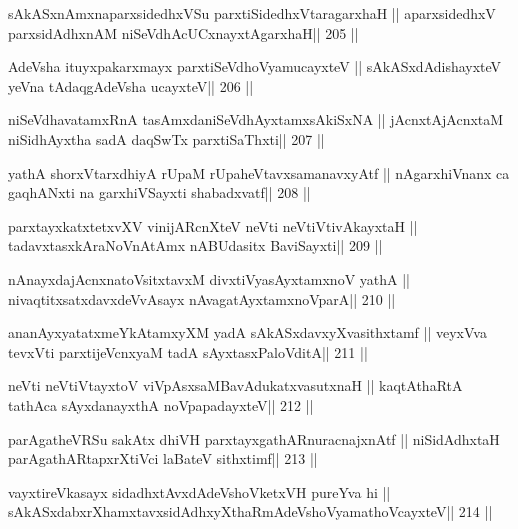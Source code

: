 \begin{shl}
sAkASxnAmxnaparxsidedhxVSu parxtiSidedhxVtaragarxhaH ||
aparxsidedhxV parxsidAdhxnAM niSeVdhAcUCxnayxtAgarxhaH\hfill || 205 ||
\end{shl}

\begin{shl}
AdeVsha ituyxpakarxmayx parxtiSeVdhoV\s yamucayxteV ||
sAkASxdAdishayxteV yeVna tAdaqgAdeVsha ucayxteV\hfill || 206 ||
\end{shl}

\begin{shl}
niSeVdhavatamxRnA tasAmxdaniSeVdhAyxtamxsAkiSxNA ||
jAcnxtAjAcnxtaM niSidhAyxtha sadA daqSwTx parxtiSaThxti\hfill || 207 ||
\end{shl}

\begin{shl}
yathA shorxVtarxdhiyA rUpaM rUpaheVtavxsamanavxyAtf ||
nAgarxhiVnanx ca gaqhANxti na garxhiVSayxti shabadxvatf\hfill || 208 ||
\end{shl}

\begin{shl}
parxtayxkatxtetxvXV vinijARcnXteV neVti neVtiVtivAkayxtaH ||
tadavxtasxkAraNoV\s nAtAmx nABUdasitx BaviSayxti\hfill || 209 ||
\end{shl}

\begin{shl}
nAnayxdajAcnxnatoV\s sitxtavxM divxtiVyasAyx\s\s tamxnoV yathA ||
nivaqtitxsatxdavxdeVvAsayx nAvagatAyxtamxnoV\s parA\hfill || 210 ||
\end{shl}

\begin{shl}
ananAyxyatatxmeYkAtamxyXM yadA sAkASxdavxyXvasithxtamf ||
veyxVva tevxVti parxtijeVcnxyaM tadA sAyxtasxPaloVditA\hfill || 211 ||
\end{shl}

\begin{shl}
neVti neVtiVtayxtoV viVpAsxsaMBavAdukatxvasutxnaH ||
kaqtAthaRtA tathAca sAyxdanayxthA noVpapadayxteV\hfill || 212 ||
\end{shl}

\begin{shl}
parAgatheVRSu sakAtx dhiVH parxtayxgathARnuracnajxnAtf ||
niSidAdhx\s taH parAgathARtapxrXtiVci laBateV sithxtimf\hfill || 213 ||
\end{shl}

\begin{shl}
vayxtireVkasayx sidadhxtAvxdAdeVshoVketxVH pureYva hi ||
sAkASxdabxrXhamxtavxsidAdhxyXthaRmAdeVshoV\s yamathoVcayxteV\hfill || 214 ||
\end{shl}

